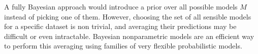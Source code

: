 A fully Bayesian approach would introduce a prior over all possible models $M$ instead of picking one of them. However, choosing the set of all sensible models for a specific dataset is non trivial, and averaging their predictions may be difficult or even intractable. Bayesian nonparametric models are an efficient way to perform this averaging using families of very flexible probabilistic models. 

